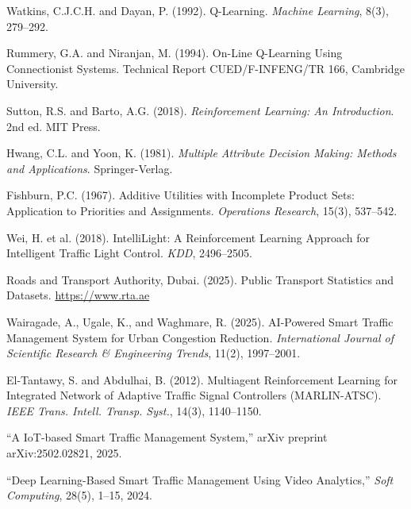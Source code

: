 \documentclass[12pt, a4paper]{article}
\begin{document}
\begin{enumerate}[label={[\arabic*]}, nosep]
    \item \label{ref:watkins} Watkins, C.J.C.H. and Dayan, P. (1992). Q-Learning. \textit{Machine Learning}, 8(3), 279--292.
    \item \label{ref:rummery} Rummery, G.A. and Niranjan, M. (1994). On-Line Q-Learning Using Connectionist Systems. Technical Report CUED/F-INFENG/TR 166, Cambridge University.
    \item \label{ref:sutton} Sutton, R.S. and Barto, A.G. (2018). \textit{Reinforcement Learning: An Introduction}. 2nd ed. MIT Press.
    \item \label{ref:topsis} Hwang, C.L. and Yoon, K. (1981). \textit{Multiple Attribute Decision Making: Methods and Applications}. Springer-Verlag.
    \item \label{ref:wsm} Fishburn, P.C. (1967). Additive Utilities with Incomplete Product Sets: Application to Priorities and Assignments. \textit{Operations Research}, 15(3), 537--542.
    \item \label{ref:traffic_rl} Wei, H. et al. (2018). IntelliLight: A Reinforcement Learning Approach for Intelligent Traffic Light Control. \textit{KDD}, 2496--2505.
    \item \label{ref:dubai_rta} Roads and Transport Authority, Dubai. (2025). Public Transport Statistics and Datasets. \url{https://www.rta.ae}
    \item \label{ref:aitraffic} Wairagade, A., Ugale, K., and Waghmare, R. (2025). AI-Powered Smart Traffic Management System for Urban Congestion Reduction. \textit{International Journal of Scientific Research \& Engineering Trends}, 11(2), 1997--2001.
    \item \label{ref:marlin} El-Tantawy, S. and Abdulhai, B. (2012). Multiagent Reinforcement Learning for Integrated Network of Adaptive Traffic Signal Controllers (MARLIN-ATSC). \textit{IEEE Trans. Intell. Transp. Syst.}, 14(3), 1140--1150.
    \item \label{ref:iottraffic} ``A IoT-based Smart Traffic Management System,'' arXiv preprint arXiv:2502.02821, 2025.
    \item \label{ref:deeplearning_traffic} ``Deep Learning-Based Smart Traffic Management Using Video Analytics,'' \textit{Soft Computing}, 28(5), 1--15, 2024.
\end{enumerate}
\end{document}
